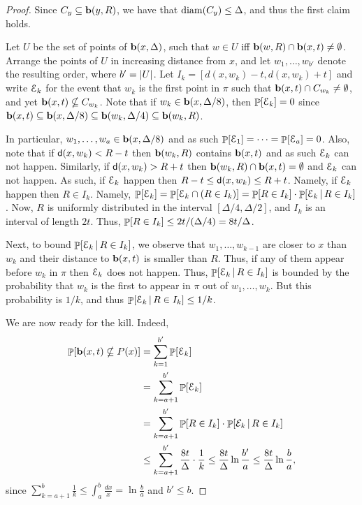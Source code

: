 \begin{proof}
    Since $C_y \subseteq \mathbf{b}(y, R)$, we have that $\mathrm{diam}(C_y) \leq
    \Delta$, and thus the first claim holds.
        
    Let $U$ be the set of points of $\mathbf{b}(x, \Delta)$, such that $w
    \in U$ iff $\mathbf{b}(w,R) \cap \mathbf{b}(x,t) \ne \emptyset$.  Arrange
    the points of $U$ in increasing distance from $x$, and let $w_1,
    \ldots, w_{b'}$ denote the resulting order, where $b'=
    \left| {U} \right|$.  Let $I_k = [d(x, w_k)-t, d(x,w_k)+t]$ and write
    $\EuScript{E}_k$ for the event that $w_k$ is the first point in $\pi$
    such that $\mathbf{b}(x,t) \cap C_{w_k} \neq \emptyset$, and yet
    $\mathbf{b}(x,t) \nsubseteq C_{w_k}$.  Note that if $w_k \in \mathbf{b}(x,
    \Delta/8)$, then $\Prob{\Event_k} = 0$ since $\mathbf{b}(x, t)
    \subseteq \mathbf{b}(x, \Delta/8) \subseteq \mathbf{b}(w_k, \Delta/4)
    \subseteq \mathbf{b}(w_k, R)$.
    
    In particular, $w_1, \ldots, w_a \in \mathbf{b}(x,\Delta/8)$ and as
    such $\Prob{ \Event_1} = \cdots = \Prob{ \Event_a} = 0$.  Also,
    note that if $\mathsf{d}(x, w_k)< R- t$ then $\mathbf{b}(w_k, R)$ contains
    $\mathbf{b}(x, t)$ and as such $\EuScript{E}_k$ can not happen. Similarly, if
    $\mathsf{d}(x, w_k) > R + t$ then $\mathbf{b}(w_k, R) \cap \mathbf{b}(x, t) =
    \emptyset$ and $\EuScript{E}_k$ can not happen. As such, if $\EuScript{E}_k$
    happen then $R-t \leq \mathsf{d}(x,w_k) \leq R+t$. Namely, if
    $\EuScript{E}_k$ happen then $R \in I_k$. Namely, $\Prob{ \Event_k } =
    \Prob{ \Event_k \cap (R \in I_k) } = \Prob{R \in I_k} \cdot \Prob{
       \Event_k\,|\,R \in I_k}$. Now, $R$ is uniformly distributed in
    the interval $[\Delta/4, \Delta/2]$, and $I_k$ is an interval of
    length $2t$. Thus, $\Prob{R \in I_k} \leq 2t/(\Delta/4) =
    8t/\Delta$. 
    
    Next, to bound $\Prob{ \Event_k\,|\,R \in I_k}$, we observe that
    $w_1, \ldots, w_{k-1}$ are closer to $x$ than $w_k$ and their
    distance to $\mathbf{b}(x,t)$ is smaller than $R$. Thus, if any of them
    appear before $w_k$ in $\pi$ then $\EuScript{E}_k$ does not
    happen. Thus, $\Prob{ \Event_k\,|\,R \in I_k}$ is bounded by the
    probability that $w_k$ is the first to appear in $\pi$ out of
    $w_1, \ldots, w_k$. But this probability is $1/k$, and thus
    $\Prob{ \Event_k\,|\,R \in I_k} \leq 1/k$.
    
    We are now ready for the kill. Indeed,
    \begin{align*}
      \Prob{\Ball(x,t) \nsubseteq P(x)}%
      &=%
        \sum_{k=1}^{b'} \Prob{\Event_k}
      \\&
        = \sum_{k=a+1}^{b'} \Prob{\Event_k}
      \\&
        =%
        \sum_{k=a+1}^{b'} \Prob{R \in I_k} \cdot \Prob{\mathcal
        E_k\,|\,R \in I_k}     %
      \\&
      \leq%
      \sum_{k=a+1}^{b'} \frac{8t}{\Delta} \cdot \frac{1}{k}%
      \leq%
      \frac{8t}{\Delta} \ln \frac{b'}{a}%
      \leq%
      \frac{8t}{\Delta} \ln \frac{b}{a},
    \end{align*}
    since $\sum_{k=a+1}^b \frac{1}{k} \leq \int_{a}^b \frac{dx}{x} =
    \ln \frac{b}{a}$ and $b' \leq b$.
\end{proof}


